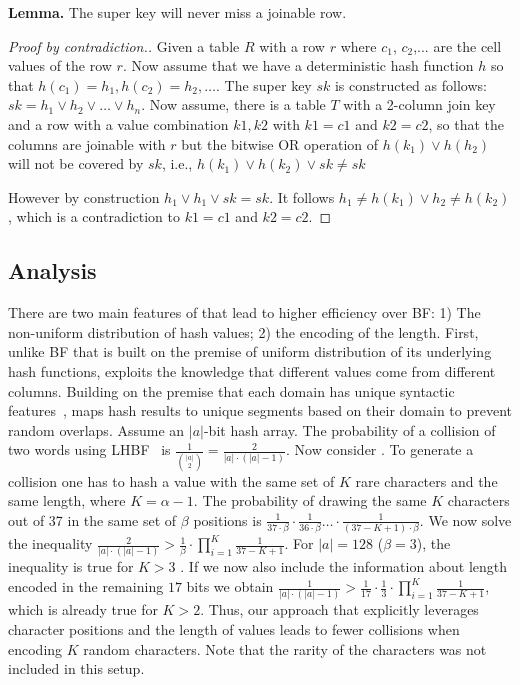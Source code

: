 \textbf{Lemma.} The super key will never miss a joinable row.
\begin{proof}[Proof by contradiction.]
Given a table $R$ with a row $r$ where $c_1$, $c_2$,... are the cell values of the row $r$. Now assume that we have a deterministic hash function $h$ so that $h(c_1) =h_1, h(c_2) = h_2, \dots$. The super key $sk$ is constructed as follows: $sk = h_1 \lor h_2 \lor … \lor h_n.$
Now assume, there is a table $T$ with a 2-column join key and a row with a value combination ${k1, k2}$ with $k1=c1$ and $k2=c2$, so that the columns are joinable with $r$ but the bitwise OR operation of $h(k_1) \lor h(h_2)$ will not be covered by $sk$, i.e.,
$h(k_1) \lor h(k_2) \lor sk \neq sk$

However by construction $h_1 \lor h_1 \lor sk = sk$.
It follows $h_1 \neq h(k_1) \lor h_2 \neq h(k_2)$, which is a contradiction to $k1=c1$ and $k2=c2$. 
\end{proof}


\subsection{Analysis} \label{subsec:proof}
There are two main features of \hash that lead to higher efficiency over BF:  1) The non-uniform distribution of hash values; 2) the encoding of the length. First, unlike BF that is built on the premise of uniform distribution of its underlying hash functions, 
\hash exploits the knowledge that different values come from different columns. Building on the premise that each domain has unique syntactic features~\cite{DBLP:journals/pvldb/ZhangSLHDT20}, \hash maps hash results to unique segments based on their domain to prevent random overlaps.
Assume an $|a|$-bit hash array. The probability of a collision of two words using LHBF~\cite{DBLP:conf/esa/KirschM06} is $\frac{1}{\binom{|a|}{2}}= \frac{2}{|a|\cdot (|a|-1)}$.
Now consider \hash. To generate a collision one has to hash a value with the same set of $K$ rare characters and the same length, where $K = \alpha -1$. The probability of drawing the same $K$ characters out of 37 in the same set of $\beta$ positions is $\frac{1}{37\cdot\beta}\cdot \frac{1}{36\cdot\beta} \dots \cdot \frac{1}{(37-K+1)\cdot \beta}$. We now solve the inequality $\frac{2}{|a|\cdot (|a|-1)}>\frac{1}{\beta}\cdot \prod_{i=1}^{K}{\frac{1}{37-K+1}}$. For  $|a|=128$ ($ \beta = 3$), the inequality is true for $K>3$ . If we now also include the information about length encoded in the remaining $17$ bits we obtain $\frac{1}{|a|\cdot (|a|-1)}>\frac{1}{17}\cdot \frac{1}{3}\cdot \prod_{i=1}^{K}{\frac{1}{37-K+1}}$, which is already true for $K>2$. Thus, our approach that explicitly leverages character positions and the length of values leads to fewer collisions when encoding $K$ random characters. Note that the rarity of the characters was not included in this setup. 
